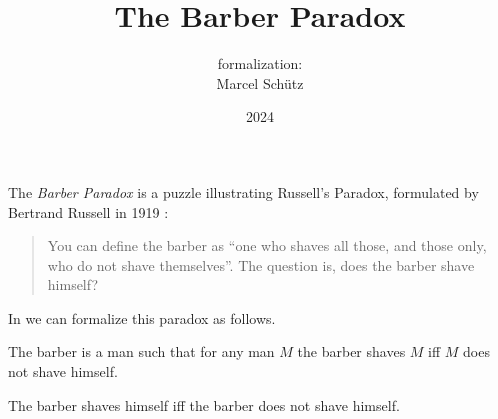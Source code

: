 \documentclass[english]{article}
\title{The Barber Paradox}
\author{\Naproche formalization:\\[0.5em]Marcel Schütz}
\date{2024}
\begin{document}
  \maketitle

  \begin{forthel}
  \end{forthel}

  \noindent The \emph{Barber Paradox} is a puzzle illustrating Russell's
  Paradox, formulated by Bertrand Russell in 1919 \cite[p. 355]{Russell1919}:

  \begin{quotation}
    \noindent You can define the barber as ``one who shaves all those, and 
    those only, who do not shave themselves''.
    The question is, does the barber shave himself?
  \end{quotation}
  
  \noindent In \Naproche we can formalize this paradox as follows.

  \begin{forthel}
    \begin{signature*}
      The barber is a man such that for any man $M$ the barber shaves $M$ iff $M$ does not shave himself.
    \end{signature*}
    
    \begin{theorem*}\label{barber_paradox}
      The barber shaves himself iff the barber does not shave himself.
    \end{theorem*}
  \end{forthel}

  \printbibliography
\end{document}
